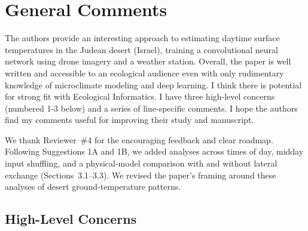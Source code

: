 \documentclass[12pt,english]{reviewresponse}
\begin{document}
\clearpage

\reviewer

\section*{General Comments}

\begin{generalcomment}
The authors provide an interesting approach to estimating daytime surface temperatures in the Judean desert (Israel), training a convolutional neural network using drone imagery and a weather station. Overall, the paper is well written and accessible to an ecological audience even with only rudimentary knowledge of microclimate modeling and deep learning. I think there is potential for strong fit with Ecological Informatics. I have three high-level concerns (numbered 1-3 below) and a series of line-specific comments. I hope the authors find my comments useful for improving their study and manuscript.
\end{generalcomment}

\begin{revresponse}
We thank Reviewer~\#4 for the encouraging feedback and clear roadmap. Following Suggestions 1A and 1B, we added analyses across times of day, midday input shuffling, and a physical-model comparison with and without lateral exchange (Sections~3.1--3.3). We revised the paper's framing around these analyses of desert ground-temperature patterns.
\end{revresponse}

\subsection*{High-Level Concerns}
\end{document}
